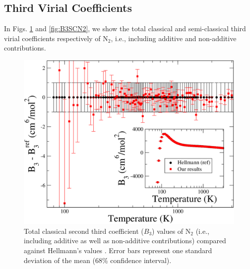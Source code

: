    \subsection{Third Virial Coefficients}
        In Figs. \ref{fig:B3CLN2} and \ref{fig:B3SCN2}, we show the total classical and semi-classical third virial coefficients respectively of N$_2$, i.e., including additive and non-additive contributions.
        \begin{figure}[!htbp]
            \centering
            \includegraphics[scale=0.20,keepaspectratio]{Chapter-5/Figures/B3N2CL9sResults.png}
            \caption{Total classical second third coefficient ($B_3$) values of N$_2$ (i.e., including additive as well as non-additive contributions) compared against Hellmann's values \cite{Hellmann2013}. Error bars represent one standard deviation of the mean (68\% confidence interval).}
            \label{fig:B3CLN2}
        \end{figure}

